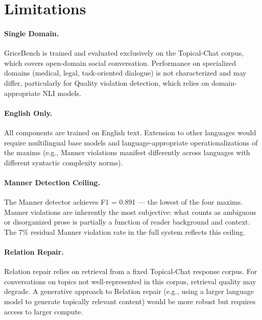 \documentclass[11pt]{article}
\begin{document}
\section*{Limitations}
\label{sec:limitations}

\paragraph{Single Domain.}
GriceBench is trained and evaluated exclusively on the Topical-Chat corpus,
which covers open-domain social conversation. Performance on specialized
domains (medical, legal, task-oriented dialogue) is not characterized and
may differ, particularly for Quality violation detection, which relies on
domain-appropriate NLI models.

\paragraph{English Only.}
All components are trained on English text. Extension to other languages would
require multilingual base models and language-appropriate operationalizations
of the maxims (e.g., Manner violations manifest differently across languages
with different syntactic complexity norms).

\paragraph{Manner Detection Ceiling.}
The Manner detector achieves F1 = 0.891 --- the lowest of the four maxims.
Manner violations are inherently the most subjective: what counts as ambiguous
or disorganized prose is partially a function of reader background and context.
The 7\% residual Manner violation rate in the full system reflects this ceiling.

\paragraph{Relation Repair.}
Relation repair relies on retrieval from a fixed Topical-Chat response corpus.
For conversations on topics not well-represented in this corpus, retrieval
quality may degrade. A generative approach to Relation repair (e.g., using
a larger language model to generate topically relevant content) would be more
robust but requires access to larger compute.



\end{document}
